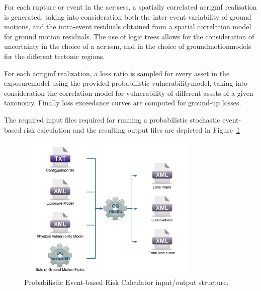 For each \gls{rupture} or event in the \glspl{acr:ses}, a spatially correlated
\gls{acr:gmf} realisation is generated, taking into consideration both the
inter-event variability of ground motions, and the intra-event residuals
obtained from a spatial correlation model for ground motion residuals. The use
of logic trees allows for the consideration of uncertainty in the choice of a
\glsdesc{acr:ssm}, and in the choice of \glspl{groundmotionmodel} for the
different tectonic regions.

For each \gls{acr:gmf} realization, a loss ratio is sampled for every
\gls{asset} in the \gls{exposuremodel} using the provided probabilistic
\gls{vulnerabilitymodel}, taking into consideration the correlation model for
vulnerability of different \glspl{asset} of a given taxonomy. Finally loss
exceedance curves are computed for ground-up losses.

The required input files required for running a probabilistic stochastic
event-based risk calculation and the resulting output files are depicted in
Figure~\ref{fig:io-structure-event-based-risk}

\begin{figure}[ht]
\centering
\includegraphics[width=9cm,height=7cm]{figures/risk/io-structure-event-based-risk.pdf}
\caption{Probabilistic Event-based Risk Calculator input/output structure.}
\label{fig:io-structure-event-based-risk}
\end{figure}
